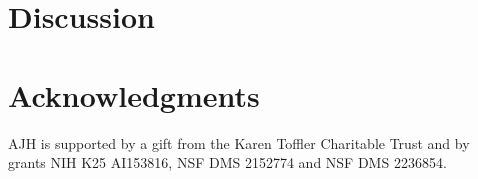 \documentclass[12pt]{article} %
\begin{document}
\section{Discussion}


\section*{Acknowledgments}

AJH is supported by a gift from the Karen Toffler Charitable Trust and by grants NIH K25 AI153816, NSF DMS 2152774 and NSF DMS 2236854.

%
%
\end{document}
